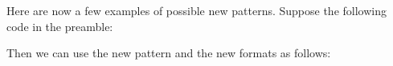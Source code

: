 \documentclass[load-preamble+]{cnltx-doc}
\newcommand*\myoddnumber[1]{\the\numexpr2*(#1)-1\relax}
\begin{document}
Here are now a few examples of possible new patterns. Suppose the following code
in the preamble:
\begin{sourcecode}
  \usepackage{alphalph,fmtcount}
  \newcommand*\myoddnumber[1]{\the\numexpr2*(#1)-1\relax}


  \setcounter{test}{4}
\end{sourcecode}

Then we can use the new pattern and the new formats as
follows:\setcounter{test}{4}
\begin{example}
\end{example}
\end{document}
